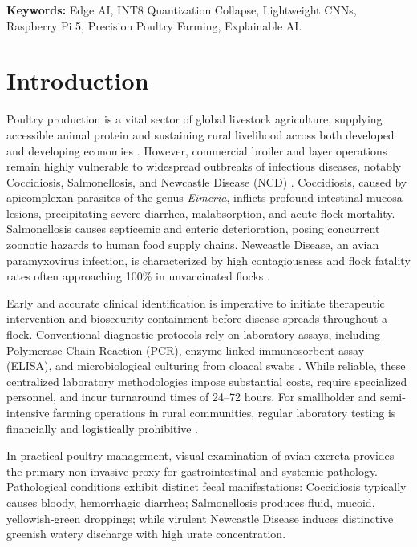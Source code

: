 \documentclass[11pt,a4paper]{article}
\begin{document}
\vspace{0.5em}
\noindent \textbf{Keywords:} Edge AI, INT8 Quantization Collapse, Lightweight CNNs, Raspberry Pi 5, Precision Poultry Farming, Explainable AI.

\section{Introduction}
Poultry production is a vital sector of global livestock agriculture, supplying accessible animal protein and sustaining rural livelihood across both developed and developing economies \cite{usda2024}. However, commercial broiler and layer operations remain highly vulnerable to widespread outbreaks of infectious diseases, notably Coccidiosis, Salmonellosis, and Newcastle Disease (NCD) \cite{machuve2022}. Coccidiosis, caused by apicomplexan parasites of the genus \textit{Eimeria}, inflicts profound intestinal mucosa lesions, precipitating severe diarrhea, malabsorption, and acute flock mortality. Salmonellosis causes septicemic and enteric deterioration, posing concurrent zoonotic hazards to human food supply chains. Newcastle Disease, an avian paramyxovirus infection, is characterized by high contagiousness and flock fatality rates often approaching 100\% in unvaccinated flocks \cite{swayne2020}.

Early and accurate clinical identification is imperative to initiate therapeutic intervention and biosecurity containment before disease spreads throughout a flock. Conventional diagnostic protocols rely on laboratory assays, including Polymerase Chain Reaction (PCR), enzyme-linked immunosorbent assay (ELISA), and microbiological culturing from cloacal swabs \cite{tasdelen2025}. While reliable, these centralized laboratory methodologies impose substantial costs, require specialized personnel, and incur turnaround times of 24--72 hours. For smallholder and semi-intensive farming operations in rural communities, regular laboratory testing is financially and logistically prohibitive \cite{degu2023}. 

In practical poultry management, visual examination of avian excreta provides the primary non-invasive proxy for gastrointestinal and systemic pathology. Pathological conditions exhibit distinct fecal manifestations: Coccidiosis typically causes bloody, hemorrhagic diarrhea; Salmonellosis produces fluid, mucoid, yellowish-green droppings; while virulent Newcastle Disease induces distinctive greenish watery discharge with high urate concentration.
\end{document}
